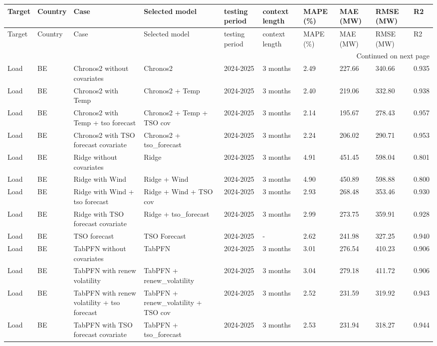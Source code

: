 \begin{longtable}{llllllllll}
\toprule
Target & Country & Case & Selected model & testing period & context length & MAPE (\%) & MAE (MW) & RMSE (MW) & R2 \\
\midrule
\endfirsthead
\toprule
Target & Country & Case & Selected model & testing period & context length & MAPE (\%) & MAE (MW) & RMSE (MW) & R2 \\
\midrule
\endhead
\midrule
\multicolumn{10}{r}{Continued on next page} \\
\midrule
\endfoot
\bottomrule
\endlastfoot
Load & BE & Chronos2 without covariates & Chronos2 & 2024-2025 & 3 months & 2.49 & 227.66 & 340.66 & 0.935 \\
Load & BE & Chronos2 with Temp & Chronos2 + Temp & 2024-2025 & 3 months & 2.40 & 219.06 & 332.80 & 0.938 \\
Load & BE & Chronos2 with Temp + tso forecast & Chronos2 + Temp + TSO cov & 2024-2025 & 3 months & 2.14 & 195.67 & 278.43 & 0.957 \\
Load & BE & Chronos2 with TSO forecast covariate & Chronos2 + tso\_forecast & 2024-2025 & 3 months & 2.24 & 206.02 & 290.71 & 0.953 \\
Load & BE & Ridge without covariates & Ridge & 2024-2025 & 3 months & 4.91 & 451.45 & 598.04 & 0.801 \\
Load & BE & Ridge with Wind & Ridge + Wind & 2024-2025 & 3 months & 4.90 & 450.89 & 598.88 & 0.800 \\
Load & BE & Ridge with Wind + tso forecast & Ridge + Wind + TSO cov & 2024-2025 & 3 months & 2.93 & 268.48 & 353.46 & 0.930 \\
Load & BE & Ridge with TSO forecast covariate & Ridge + tso\_forecast & 2024-2025 & 3 months & 2.99 & 273.75 & 359.91 & 0.928 \\
Load & BE & TSO forecast & TSO Forecast & 2024-2025 & - & 2.62 & 241.98 & 327.25 & 0.940 \\
Load & BE & TabPFN without covariates & TabPFN & 2024-2025 & 3 months & 3.01 & 276.54 & 410.23 & 0.906 \\
Load & BE & TabPFN with renew volatility & TabPFN + renew\_volatility & 2024-2025 & 3 months & 3.04 & 279.18 & 411.72 & 0.906 \\
Load & BE & TabPFN with renew volatility + tso forecast & TabPFN + renew\_volatility + TSO cov & 2024-2025 & 3 months & 2.52 & 231.59 & 319.92 & 0.943 \\
Load & BE & TabPFN with TSO forecast covariate & TabPFN + tso\_forecast & 2024-2025 & 3 months & 2.53 & 231.94 & 318.27 & 0.944 \\

\end{longtable}
